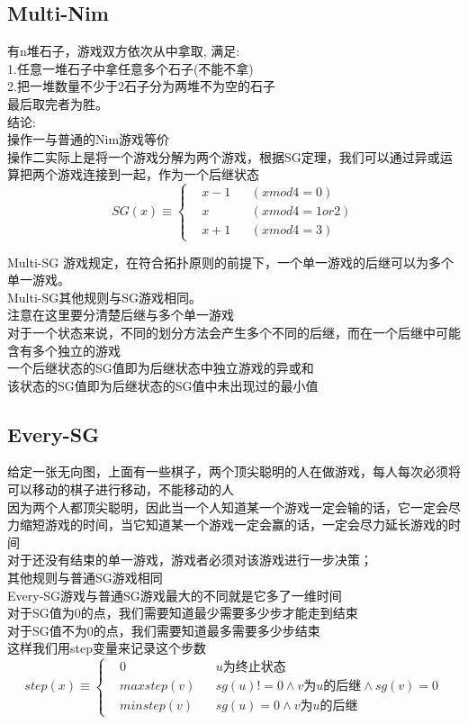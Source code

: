 \documentclass[10pt]{ctexart}
\begin{document}
{\subsection{Multi-Nim}
有n堆石子，游戏双方依次从中拿取, 满足:\\
1.任意一堆石子中拿任意多个石子(不能不拿)\\
2.把一堆数量不少于2石子分为两堆不为空的石子\\
最后取完者为胜。\\
结论:\\
操作一与普通的Nim游戏等价\\
操作二实际上是将一个游戏分解为两个游戏，根据SG定理，我们可以通过异或运算把两个游戏连接到一起，作为一个后继状态\\
\begin{equation}
    SG(x)\equiv\left\{
    \begin{aligned}
    &x-1 & & (x mod 4 = 0) \\
    &x   & & (x mod 4 = 1 or 2)  \\
    &x+1 & & (x mod 4 = 3)
    \end{aligned}
    \right.
\end{equation}
\par
Multi-SG 游戏规定，在符合拓扑原则的前提下，一个单一游戏的后继可以为多个单一游戏。\\
Multi-SG其他规则与SG游戏相同。\\
注意在这里要分清楚后继与多个单一游戏\\
对于一个状态来说，不同的划分方法会产生多个不同的后继，而在一个后继中可能含有多个独立的游戏\\
一个后继状态的SG值即为后继状态中独立游戏的异或和\\
该状态的SG值即为后继状态的SG值中未出现过的最小值\\
\subsection{Every-SG}
给定一张无向图，上面有一些棋子，两个顶尖聪明的人在做游戏，每人每次必须将可以移动的棋子进行移动，不能移动的人\\
因为两个人都顶尖聪明，因此当一个人知道某一个游戏一定会输的话，它一定会尽力缩短游戏的时间，当它知道某一个游戏一定会赢的话，一定会尽力延长游戏的时间\\
对于还没有结束的单一游戏，游戏者必须对该游戏进行一步决策；\\
其他规则与普通SG游戏相同\\
Every-SG游戏与普通SG游戏最大的不同就是它多了一维时间\\
对于SG值为0的点，我们需要知道最少需要多少步才能走到结束\\
对于SG值不为0的点，我们需要知道最多需要多少步结束\\
这样我们用step变量来记录这个步数\\
\begin{equation}
    step(x)\equiv\left\{
    \begin{aligned}
    &0            & & u为终止状态 \\
    &max{step(v)} & & sg(u)!=0∧v为u的后继∧sg(v)=0\\
    &min{step(v)} & & sg(u)=0∧v为u的后继
    \end{aligned}
    \right.
\end{equation}
}
\end{document}
